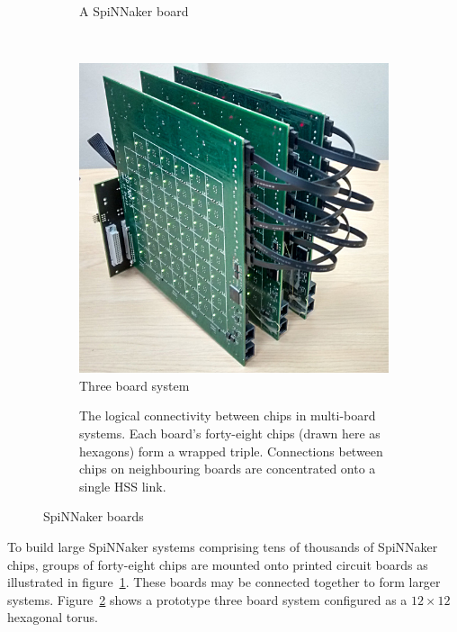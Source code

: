 \begin{figure}
\begin{subfigure}[b]{0.45\linewidth}
				\caption{A SpiNNaker board}
				\label{fig:spinnakerBoard}
			\end{subfigure}
			~~~
			\begin{subfigure}[b]{0.45\linewidth}
				\center
				\includegraphics[width=\linewidth]{figures/threeboard.jpg}
				
				\caption{Three board system}
				\label{fig:threeboard}
			\end{subfigure}
			
			\vspace*{2em}
			
			\begin{subfigure}{\linewidth}
				\center
				
				\caption{The logical connectivity between chips in multi-board systems.
				Each board's forty-eight chips (drawn here as hexagons) form a wrapped
				triple. Connections between chips on neighbouring boards are
				concentrated onto a single HSS link.}
				\label{fig:sata-connections} \end{subfigure}
			
			\caption{SpiNNaker boards}
			\label{fig:spinnaker-boards}
		\end{figure}
		
		To build large SpiNNaker systems comprising tens of thousands of
		SpiNNaker chips, groups of forty-eight chips are mounted onto printed
		circuit boards as illustrated in figure~\ref{fig:spinnakerBoard}. These
		boards may be connected together to form larger systems.
		Figure~\ref{fig:threeboard} shows a prototype three board system configured
		as a $12\times12$ hexagonal torus.
		

